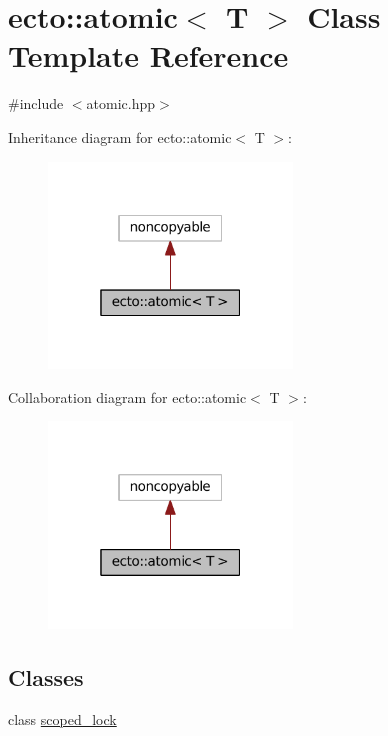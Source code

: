 \hypertarget{classecto_1_1atomic}{\section{ecto\-:\-:atomic$<$ T $>$ Class Template Reference}
\label{classecto_1_1atomic}
}


{\ttfamily \#include $<$atomic.\-hpp$>$}



Inheritance diagram for ecto\-:\-:atomic$<$ T $>$\-:\nopagebreak
\begin{figure}[H]
\begin{center}
\leavevmode
\includegraphics[width=184pt]{classecto_1_1atomic__inherit__graph}
\end{center}
\end{figure}


Collaboration diagram for ecto\-:\-:atomic$<$ T $>$\-:\nopagebreak
\begin{figure}[H]
\begin{center}
\leavevmode
\includegraphics[width=184pt]{classecto_1_1atomic__coll__graph}
\end{center}
\end{figure}
\subsection*{Classes}
\begin{DoxyCompactItemize}
\item 
class \hyperlink{classecto_1_1atomic_1_1scoped__lock}{scoped\-\_\-lock}
\end{DoxyCompactItemize}

